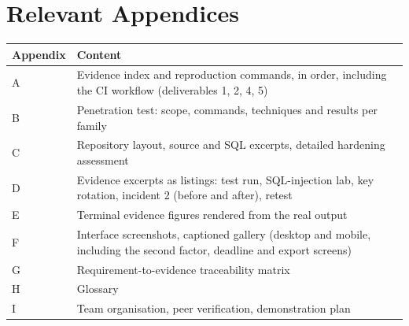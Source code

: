 \documentclass[10pt,a4paper]{article}
\begin{document}
\section{Relevant Appendices}\label{sec:appx}
\begin{center}\small
\begin{tabularx}{\linewidth}{@{}L{3.6cm}Y@{}}
\toprule\textbf{Appendix} & \textbf{Content}\\\midrule
A & Evidence index and reproduction commands, in order, including the CI workflow (deliverables 1, 2, 4, 5)\\
B & Penetration test: scope, commands, techniques and results per family\\
C & Repository layout, source and SQL excerpts, detailed hardening assessment\\
D & Evidence excerpts as listings: test run, SQL-injection lab, key rotation, incident 2 (before and after), retest\\
E & Terminal evidence figures rendered from the real output\\
F & Interface screenshots, captioned gallery (desktop and mobile, including the second factor, deadline and export screens)\\
G & Requirement-to-evidence traceability matrix\\
H & Glossary\\
I & Team organisation, peer verification, demonstration plan\\
\bottomrule\end{tabularx}\end{center}
\end{document}
